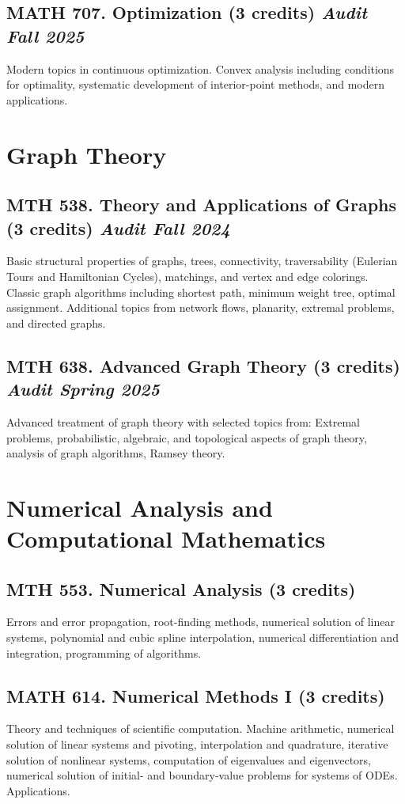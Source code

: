 \documentclass[11pt]{article}
\newcommand{\coursestatus}[1]{\hfill\normalsize\normalfont\textit{#1}}
\begin{document}
\subsection{MATH 707. Optimization \mdseries(3 credits) \coursestatus{Audit Fall 2025}}
Modern topics in continuous optimization. Convex analysis including conditions for optimality, systematic development of interior-point methods, and modern applications.

\section{Graph Theory}

\subsection{MTH 538. Theory and Applications of Graphs \mdseries(3 credits) \coursestatus{Audit Fall 2024}}
Basic structural properties of graphs, trees, connectivity, traversability (Eulerian Tours and Hamiltonian Cycles), matchings, and vertex and edge colorings. Classic graph algorithms including shortest path, minimum weight tree, optimal assignment. Additional topics from network flows, planarity, extremal problems, and directed graphs.

\subsection{MTH 638. Advanced Graph Theory \mdseries(3 credits) \coursestatus{Audit Spring 2025}}
Advanced treatment of graph theory with selected topics from: Extremal problems, probabilistic, algebraic, and topological aspects of graph theory, analysis of graph algorithms, Ramsey theory.

\section{Numerical Analysis and Computational Mathematics}

\subsection{MTH 553. Numerical Analysis \mdseries(3 credits)}
Errors and error propagation, root-finding methods, numerical solution of linear systems, polynomial and cubic spline interpolation, numerical differentiation and integration, programming of algorithms.

\subsection{MATH 614. Numerical Methods I \mdseries(3 credits)}
Theory and techniques of scientific computation. Machine arithmetic, numerical solution of linear systems and pivoting, interpolation and quadrature, iterative solution of nonlinear systems, computation of eigenvalues and eigenvectors, numerical solution of initial- and boundary-value problems for systems of ODEs. Applications.
\end{document}
